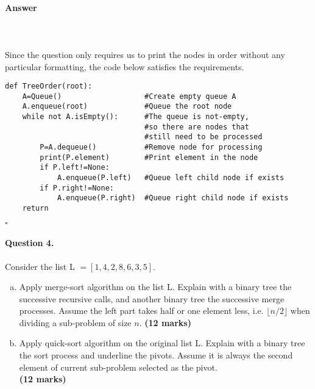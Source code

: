 \documentclass[12pt]{article}
\newcommand{\EOQ}{\hfill $\square$}
\begin{document}
\paragraph{Answer}\mbox{}\\\\
Since the question only requires us to print the nodes in order without any particular formatting, the code below satisfies the requirements.\\
\begin{verbatim}
def TreeOrder(root):
    A=Queue()                   #Create empty queue A
    A.enqueue(root)             #Queue the root node
    while not A.isEmpty():      #The queue is not-empty,
                                #so there are nodes that 
                                #still need to be processed
        P=A.dequeue()           #Remove node for processing
        print(P.element)        #Print element in the node
        if P.left!=None:         
            A.enqueue(P.left)   #Queue left child node if exists
        if P.right!=None:        
            A.enqueue(P.right)  #Queue right child node if exists
    return
\end{verbatim}
\EOQ
\paragraph{Question 4.} Consider the list L $=[1,4,2,8,6,3,5]$.
\begin{enumerate}[(a)]
\item Apply merge-sort algorithm on the list L. Explain with a binary tree the successive recursive calls, and another binary tree the successive merge processes. Assume the left part takes half or one element less, i.e. $\lfloor n/2\rfloor$ when dividing a sub-problem of size $n$. \hfill {\bf (12 marks)}
\item Apply quick-sort algorithm on the original list L. Explain with a binary tree the sort process and underline the pivots. Assume it is always the second element of current sub-problem selected as the pivot.\\\mbox{}\hfill {\bf (12 marks)}
\end{enumerate}
\end{document}
